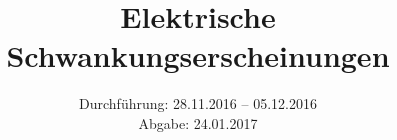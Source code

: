 

\subject{Versuch 57}
\title{Elektrische Schwankungserscheinungen}
\date{Durchführung: 28.11.2016 -- 05.12.2016 \\
      Abgabe: 24.01.2017}



\maketitle
\newpage







\newpage


\printbibliography


